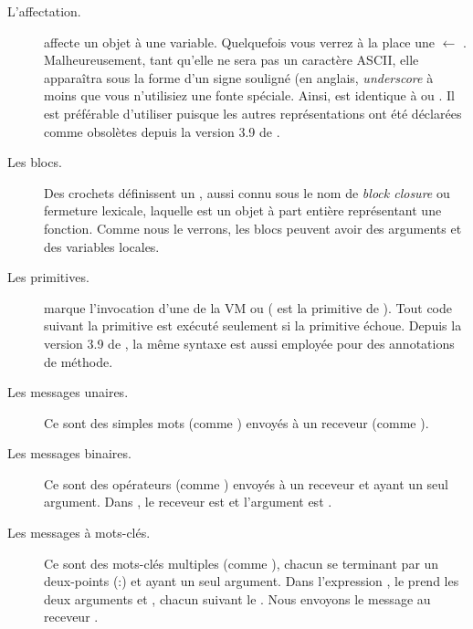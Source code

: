 \documentclass[a4paper,10pt,twoside]{book}
\begin{document}
\begin{description}
\item[L'affectation.]	\ct{:=} affecte un objet \`{a} une variable.
Quelquefois vous verrez \`{a} la place une $\leftarrow$ .
Malheureusement, tant qu'elle ne sera pas un caract\`{e}re
\textsc{ASCII}, elle apparaîtra sous la forme d'un signe souligné (en
anglais, \emph{underscore} \`{a} moins que vous n'utilisiez une fonte 
sp\'{e}ciale.
Ainsi,  est identique \`{a}  ou . Il est préférable d'utiliser  \ct{:=} puisque les autres repr\'{e}sentations ont \'{e}t\'{e} déclarées comme obsolètes depuis la version 3.9 de \sq.

\item[Les blocs.] Des crochets \ct{[ ]} définissent un ,
  aussi connu sous le nom de \emph{block closure} ou fermeture lexicale, laquelle est un objet \`{a} part enti\`{e}re repr\'{e}sentant une fonction.
Comme nous le verrons, les blocs peuvent avoir des arguments et des variables locales.

\item[Les primitives.]	 marque l'invocation
  d'une  de la VM ou 
( est la primitive de ).
Tout code suivant la primitive est ex\'{e}cut\'{e} seulement si la primitive \'{e}choue. Depuis la version 3.9 de \sq, la m\^{e}me syntaxe est aussi employ\'{e}e pour des annotations de m\'{e}thode.

\item[Les messages unaires.] Ce sont des simples mots (comme ) envoy\'{e}s \`{a} un receveur (comme ).

\item[Les messages binaires.] Ce sont des op\'{e}rateurs (comme \ct{+}) envoy\'{e}s \`{a} un receveur et ayant un seul argument. Dans , le receveur est  et l'argument est .

\item[Les messages \`{a} mots-cl\'{e}s.] Ce sont des mots-cl\'{e}s multiples (comme ), chacun se terminant par un deux-points (:) et ayant un seul argument. 
Dans l'expression , le   prend les deux arguments  et , chacun suivant le \lct{:}. Nous envoyons le message au receveur .


\end{description}
\end{document}
